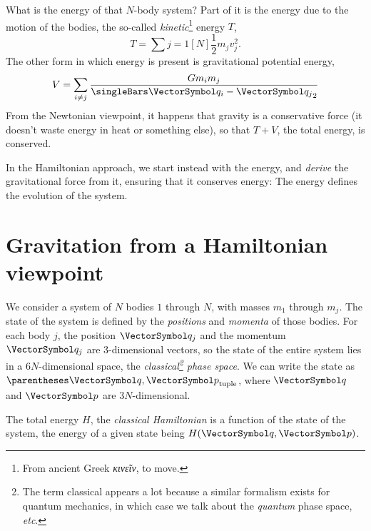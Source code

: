 \documentclass[10pt, a4paper, twoside]{basestyle}
\begin{document}
What is the energy of that $N$-body system? Part of it is the energy due to the motion of the bodies, the so-called \emph{kinetic}\footnote{From ancient Greek \emph{κινεῖν}, to move.} energy $T$, \[
T = \sum{j=1}[N] \frac12 m_j v_j^2.
\]
The other form in which energy is present is gravitational potential energy,
\[
V = \sum{i\neq j} \frac{G m_i m_j}{\norm{\vq_i - \vq_j}}
\]
From the Newtonian viewpoint, it happens that gravity is a conservative force
(it doesn't waste energy in heat or something else), so that $T + V$, the total
energy, is conserved.

In the Hamiltonian approach, we start instead with the energy, and \emph{derive}
the gravitational force from it, ensuring that it conserves energy: The energy defines the evolution of the system.

\section{Gravitation from a Hamiltonian viewpoint}
We consider a system of $N$ bodies $1$ through $N$, with masses $m_1$ through
$m_j$. The state of the system is defined by the \emph{positions} and
\emph{momenta} of those bodies. For each body $j$, the position $\vq_j$ and the
momentum $\vq_j$ are 3-dimensional vectors, so the state of the entire system
lies in a $6N$-dimensional space, the \emph{classical\footnote{The term
classical appears a lot because a similar formalism exists for quantum
mechanics, in which case we talk about the \emph{quantum} phase space,
\emph{etc}.} phase space}.
We can write the state as $\tuple{\vq, \vp}$, where $\vq$ and $\vp$ are
$3N$-dimensional.

The total energy $H$, the \emph{classical Hamiltonian} is a function of the state of the system, the energy of a given state being $H(\vq, \vp)$.
\end{document}

